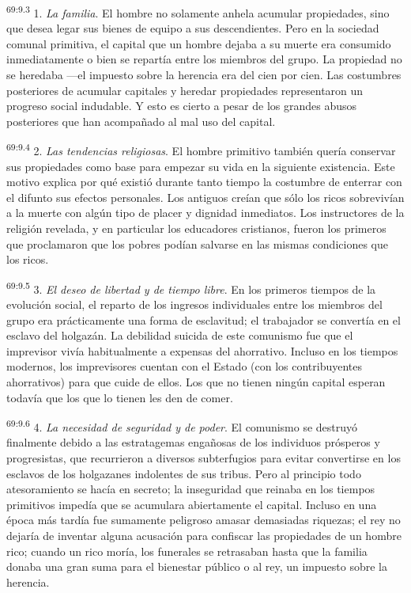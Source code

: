 \par
\textsuperscript{69:9.3} 1. \textit{La familia}. El hombre no solamente anhela acumular propiedades, sino que desea legar sus bienes de equipo a sus descendientes. Pero en la sociedad comunal primitiva, el capital que un hombre dejaba a su muerte era consumido inmediatamente o bien se repartía entre los miembros del grupo. La propiedad no se heredaba ---el impuesto sobre la herencia era del cien por cien. Las costumbres posteriores de acumular capitales y heredar propiedades representaron un progreso social indudable. Y esto es cierto a pesar de los grandes abusos posteriores que han acompañado al mal uso del capital.

\par
\textsuperscript{69:9.4} 2. \textit{Las tendencias religiosas}. El hombre primitivo también quería conservar sus propiedades como base para empezar su vida en la siguiente existencia. Este motivo explica por qué existió durante tanto tiempo la costumbre de enterrar con el difunto sus efectos personales. Los antiguos creían que sólo los ricos sobrevivían a la muerte con algún tipo de placer y dignidad inmediatos. Los instructores de la religión revelada, y en particular los educadores cristianos, fueron los primeros que proclamaron que los pobres podían salvarse en las mismas condiciones que los ricos.

\par
\textsuperscript{69:9.5} 3. \textit{El deseo de libertad y de tiempo libre}. En los primeros tiempos de la evolución social, el reparto de los ingresos individuales entre los miembros del grupo era prácticamente una forma de esclavitud; el trabajador se convertía en el esclavo del holgazán. La debilidad suicida de este comunismo fue que el imprevisor vivía habitualmente a expensas del ahorrativo. Incluso en los tiempos modernos, los imprevisores cuentan con el Estado (con los contribuyentes ahorrativos) para que cuide de ellos. Los que no tienen ningún capital esperan todavía que los que lo tienen les den de comer.

\par
\textsuperscript{69:9.6} 4. \textit{La necesidad de seguridad y de poder}. El comunismo se destruyó finalmente debido a las estratagemas engañosas de los individuos prósperos y progresistas, que recurrieron a diversos subterfugios para evitar convertirse en los esclavos de los holgazanes indolentes de sus tribus. Pero al principio todo atesoramiento se hacía en secreto; la inseguridad que reinaba en los tiempos primitivos impedía que se acumulara abiertamente el capital. Incluso en una época más tardía fue sumamente peligroso amasar demasiadas riquezas; el rey no dejaría de inventar alguna acusación para confiscar las propiedades de un hombre rico; cuando un rico moría, los funerales se retrasaban hasta que la familia donaba una gran suma para el bienestar público o al rey, un impuesto sobre la herencia.

